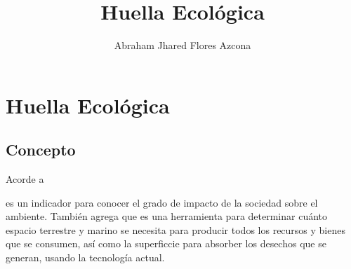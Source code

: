 \documentclass[stu, 12pt, letterpaper, donotrepeattitle, floatsintext, natbib]{apa7}
\title{\Large Huella Ecológica}
\author{Abraham Jhared Flores Azcona} %
\affiliation{Instituto Tecnológico de Tijuana}
\begin{document}
\maketitle


\renewcommand\contentsname{Contenido}
\tableofcontents
\renewcommand{\listtablename}{Tablas}
\listoftables

\newpage
\section{Huella Ecológica}
\subsection{Concepto}
Acorde a \cite{secretaria-de-medio-ambiente-y-recursos-naturales-2017} %
\begin{justifying}
  es un indicador para conocer el grado de impacto de la sociedad sobre el ambiente. También agrega que
  es una herramienta para determinar cuánto espacio terrestre y marino se necesita para producir todos los recursos
  y bienes que se consumen, así como la superficcie para absorber los desechos que se generan, usando la tecnología
  actual.\par
\end{justifying}
\vspace{\baselineskip}
\end{document}
